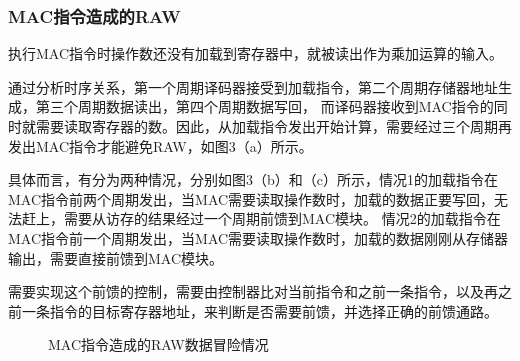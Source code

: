 \documentclass[UTF8]{ctexart}
\begin{document}
\subsubsection{MAC指令造成的RAW}
执行MAC指令时操作数还没有加载到寄存器中，就被读出作为乘加运算的输入。

通过分析时序关系，第一个周期译码器接受到加载指令，第二个周期存储器地址生成，第三个周期数据读出，第四个周期数据写回，
而译码器接收到MAC指令的同时就需要读取寄存器的数。因此，从加载指令发出开始计算，需要经过三个周期再发出MAC指令才能避免RAW，如图3（a）所示。

具体而言，有分为两种情况，分别如图3（b）和（c）所示，情况1的加载指令在MAC指令前两个周期发出，当MAC需要读取操作数时，加载的数据正要写回，无法赶上，需要从访存的结果经过一个周期前馈到MAC模块。
情况2的加载指令在MAC指令前一个周期发出，当MAC需要读取操作数时，加载的数据刚刚从存储器输出，需要直接前馈到MAC模块。

需要实现这个前馈的控制，需要由控制器比对当前指令和之前一条指令，以及再之前一条指令的目标寄存器地址，来判断是否需要前馈，并选择正确的前馈通路。

\begin{figure}[htbp]
    \centering
    \caption{MAC指令造成的RAW数据冒险情况}
    \label{Fig.main}
\end{figure}
\end{document}
